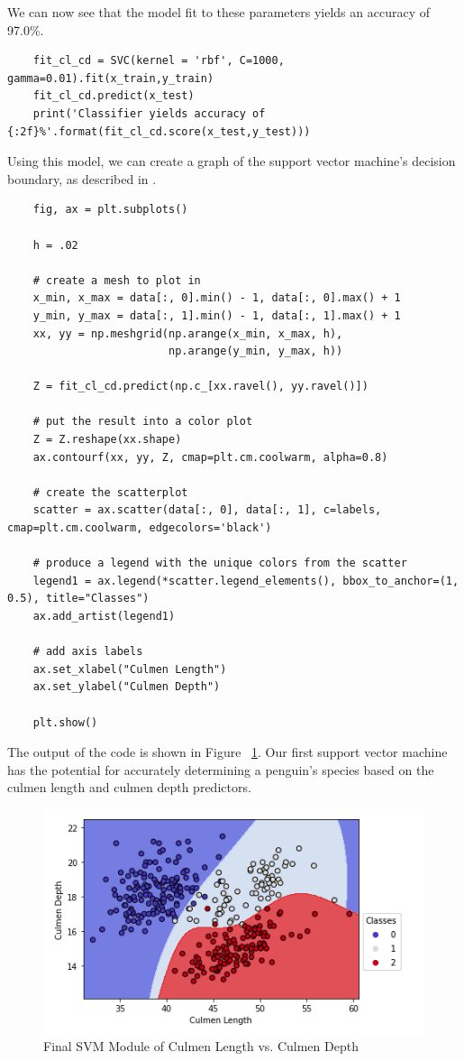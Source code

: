 \documentclass[12pt]{article}
\begin{document}
We can now see that the model fit to these parameters yields an accuracy of 97.0\%.

\begin{verbatim}
    fit_cl_cd = SVC(kernel = 'rbf', C=1000, gamma=0.01).fit(x_train,y_train)
    fit_cl_cd.predict(x_test)
    print('Classifier yields accuracy of {:2f}%'.format(fit_cl_cd.score(x_test,y_test)))
\end{verbatim}

Using this model, we can create a graph of the support vector machine's decision boundary, as described in \cite{scikit_svm_plotting}.

\begin{verbatim}
    fig, ax = plt.subplots()

    h = .02
    
    # create a mesh to plot in
    x_min, x_max = data[:, 0].min() - 1, data[:, 0].max() + 1
    y_min, y_max = data[:, 1].min() - 1, data[:, 1].max() + 1
    xx, yy = np.meshgrid(np.arange(x_min, x_max, h),
                         np.arange(y_min, y_max, h))
    
    Z = fit_cl_cd.predict(np.c_[xx.ravel(), yy.ravel()])
    
    # put the result into a color plot
    Z = Z.reshape(xx.shape)
    ax.contourf(xx, yy, Z, cmap=plt.cm.coolwarm, alpha=0.8)
    
    # create the scatterplot
    scatter = ax.scatter(data[:, 0], data[:, 1], c=labels, cmap=plt.cm.coolwarm, edgecolors='black')
    
    # produce a legend with the unique colors from the scatter
    legend1 = ax.legend(*scatter.legend_elements(), bbox_to_anchor=(1, 0.5), title="Classes")
    ax.add_artist(legend1)
    
    # add axis labels
    ax.set_xlabel("Culmen Length")
    ax.set_ylabel("Culmen Depth")
    
    plt.show()    
\end{verbatim}

The output of the code is shown in Figure ~\ref{fig_fit_cl_cd}. Our first support vector machine has the potential for accurately determining a penguin's species based on the culmen length and culmen depth predictors.

\begin{figure}[H]
    \centering
    \includegraphics[width=5in]{Figures/penguins/fit_cl_cd.png}
    \caption{Final SVM Module of Culmen Length vs. Culmen Depth}
    \label{fig_fit_cl_cd}
\end{figure}
\end{document}
